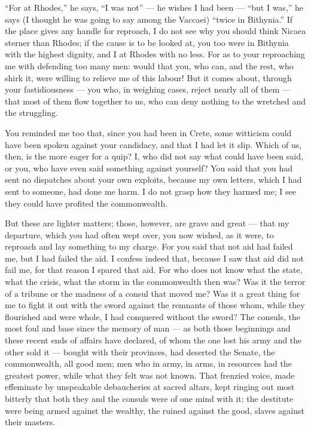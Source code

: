  ``For at Rhodes,'' he says, ``I was not'' --- he wishes I had been --- ``but I was,'' he says (I thought he was going to say among the Vaccaei) ``twice in Bithynia.'' If the place gives any handle for reproach, I do not see why you should think Nicaea sterner than Rhodes; if the cause is to be looked at, you too were in Bithynia with the highest dignity, and I at Rhodes with no less. For as to your reproaching me with defending too many men: would that you, who can, and the rest, who shirk it, were willing to relieve me of this labour! But it comes about, through your fastidiousness --- you who, in weighing cases, reject nearly all of them --- that most of them flow together to us, who can deny nothing to the wretched and the struggling.

 You reminded me too that, since you had been in Crete, some witticism could have been spoken against your candidacy, and that I had let it slip. Which of us, then, is the more eager for a quip? I, who did not say what could have been said, or you, who have even said something against yourself? You said that you had sent no dispatches about your own exploits, because my own letters, which I had sent to someone, had done me harm. I do not grasp how they harmed me; I see they could have profited the commonwealth.

 But these are lighter matters; those, however, are grave and great --- that my departure, which you had often wept over, you now wished, as it were, to reproach and lay something to my charge. For you said that not aid had failed me, but I had failed the aid. I confess indeed that, because I saw that aid did not fail me, for that reason I spared that aid. For who does not know what the state, what the crisis, what the storm in the commonwealth then was? Was it the terror of a tribune or the madness of a consul that moved me? Was it a great thing for me to fight it out with the sword against the remnants of those whom, while they flourished and were whole, I had conquered without the sword? The consuls, the most foul and base since the memory of man --- as both those beginnings and these recent ends of affairs have declared, of whom the one lost his army and the other sold it --- bought with their provinces, had deserted the Senate, the commonwealth, all good men; men who in army, in arms, in resources had the greatest power, while what they felt was not known. That frenzied voice, made effeminate by unspeakable debaucheries at sacred altars, kept ringing out most bitterly that both they and the consuls were of one mind with it; the destitute were being armed against the wealthy, the ruined against the good, slaves against their masters.

